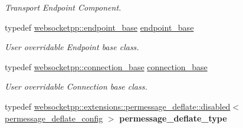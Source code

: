 \begin{DoxyCompactItemize}
\begin{DoxyCompactList}\small\item\em Transport Endpoint Component. \end{DoxyCompactList}\item 
typedef \hyperlink{classwebsocketpp_1_1endpoint__base}{websocketpp\+::endpoint\+\_\+base} \hyperlink{structwebsocketpp_1_1config_1_1debug__core_aeecf0530d869006ceab3aa4f5ee74663}{endpoint\+\_\+base}\hypertarget{structwebsocketpp_1_1config_1_1debug__core_aeecf0530d869006ceab3aa4f5ee74663}{}\label{structwebsocketpp_1_1config_1_1debug__core_aeecf0530d869006ceab3aa4f5ee74663}

\begin{DoxyCompactList}\small\item\em User overridable Endpoint base class. \end{DoxyCompactList}\item 
typedef \hyperlink{classwebsocketpp_1_1connection__base}{websocketpp\+::connection\+\_\+base} \hyperlink{structwebsocketpp_1_1config_1_1debug__core_a5ff6c6c670417fd86609c8d7a412815d}{connection\+\_\+base}\hypertarget{structwebsocketpp_1_1config_1_1debug__core_a5ff6c6c670417fd86609c8d7a412815d}{}\label{structwebsocketpp_1_1config_1_1debug__core_a5ff6c6c670417fd86609c8d7a412815d}

\begin{DoxyCompactList}\small\item\em User overridable Connection base class. \end{DoxyCompactList}\item 
typedef \hyperlink{classwebsocketpp_1_1extensions_1_1permessage__deflate_1_1disabled}{websocketpp\+::extensions\+::permessage\+\_\+deflate\+::disabled}$<$ \hyperlink{structwebsocketpp_1_1config_1_1debug__core_1_1permessage__deflate__config}{permessage\+\_\+deflate\+\_\+config} $>$ {\bfseries permessage\+\_\+deflate\+\_\+type}\hypertarget{structwebsocketpp_1_1config_1_1debug__core_a7fc8d2b3ac3f07c03b7e912524a944df}{}\label{structwebsocketpp_1_1config_1_1debug__core_a7fc8d2b3ac3f07c03b7e912524a944df}

\end{DoxyCompactItemize}
